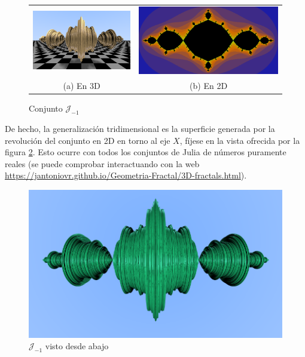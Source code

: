 \begin{figure}[ht]
    \centering
    \begin{tabular}{cc}
        \includegraphics[scale=0.37]{img/C9/julia-3D-frontal-1.png} &
      \includegraphics[scale=0.31]{img/C9/julia-2D-1.png} \\    
    (a) En 3D & (b) En 2D  \\
    \end{tabular}
    \caption{Conjunto $\mathcal{J}_{-1}$}
    \label{fig:julia-3D-2D}
\end{figure}

De hecho, la generalización tridimensional es la superficie generada por la revolución del conjunto en 2D en torno al eje $X$, fíjese en la vista ofrecida por la figura \ref{fig:julia-3D-abajo-1}. Esto ocurre con todos los conjuntos de Julia de números puramente reales (se puede comprobar interactuando con la web \url{https://jantoniovr.github.io/Geometria-Fractal/3D-fractals.html}).

\begin{figure} [ht]
    \centering
    \includegraphics[scale = 0.5]{img/C9/julia-3D-abajo-1.png}
    \caption{$\mathcal{J}_{-1}$ visto desde abajo}
    \label{fig:julia-3D-abajo-1}
\end{figure}

